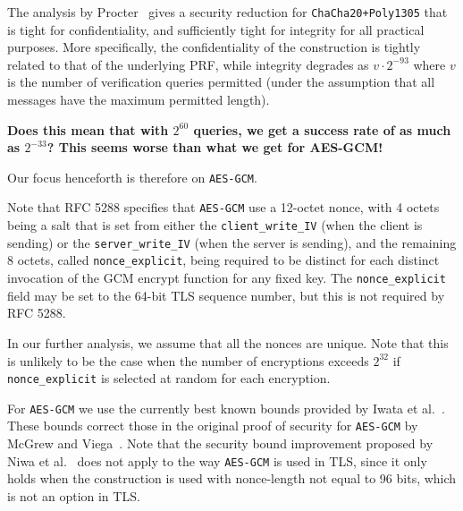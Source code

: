 \documentclass{article}
\begin{document}
The analysis by Procter~\cite{cryptoeprint:2014:613} gives a security reduction for \texttt{ChaCha20+Poly1305} that is tight for confidentiality, and sufficiently tight for integrity for all practical purposes. More specifically, the confidentiality of the construction is tightly related to that of the underlying PRF, while integrity degrades as $v \cdot 2^{-93}$ where $v$ is the number of verification queries permitted (under the assumption that all messages have the maximum permitted length).

{\bf Does this mean that with $2^{60}$ queries, we get a success rate of as much as $2^{-33}$? This seems worse than what we get for AES-GCM!}


Our focus henceforth is therefore on \texttt{AES-GCM}. 

Note that RFC 5288 specifies that \texttt{AES-GCM} use a 12-octet nonce, with 4 octets being a salt that is set from either the \verb|client_write_IV| (when the client is sending) or the \verb|server_write_IV| (when the server is sending), and the remaining 8 octets, called \verb|nonce_explicit|, being required to be distinct for each distinct invocation of the GCM encrypt function for any fixed key. The  \verb|nonce_explicit| field may be set to the 64-bit TLS sequence number, but this is not required by RFC 5288. 

In our further analysis, we assume that all the nonces are unique. Note that this is unlikely to be the case when the number of encryptions exceeds $2^{32}$ if \verb|nonce_explicit| is selected at random for each encryption.

For \texttt{AES-GCM} we use the currently best known bounds provided by Iwata et al.~\cite{GCMLNCS,cryptoeprint:2012:438}. These bounds correct those in the original proof of security for \texttt{AES-GCM} by McGrew and Viega~\cite{DBLP:conf/indocrypt/McGrewV04,DBLP:journals/iacr/McGrewV04}. Note that the security bound improvement proposed by Niwa et al.~\cite{DBLP:conf/fse/NiwaOMI15,DBLP:journals/iacr/NiwaOMI15} does not apply to the way \texttt{AES-GCM} is used in TLS, since it only holds when the construction is used with nonce-length not equal to 96 bits, which is not an option in TLS. 
\end{document}
